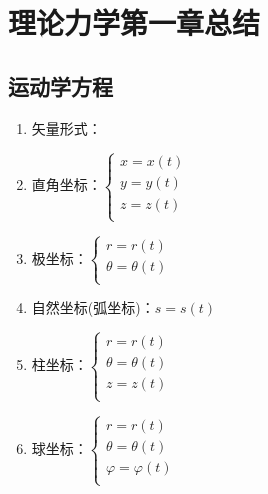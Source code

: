 \documentclass[UTF-8]{ctexart}
\begin{document}
\section{理论力学第一章总结}
\subsection{运动学方程}
\begin{enumerate}
    \item 矢量形式：
    \item 直角坐标：$
              \left \{ \begin{array}{l}
                  x=x(t) \\
                  y=y(t) \\
                  z=z(t) \\
              \end{array} \right.
          $
    \item 极坐标：$
              \left \{ \begin{array}{l}
                  r=r(t)              \\
                  \theta = \theta (t) \\
              \end{array} \right.
          $
    \item 自然坐标(弧坐标)：$
              s = s(t)
          $
    \item 柱坐标：$
              \left \{ \begin{array}{l}
                  r=r(t)              \\
                  \theta = \theta (t) \\
                  z=z(t)              \\
              \end{array} \right.
          $
    \item 球坐标：$
              \left \{ \begin{array}{l}
                  r=r(t)                \\
                  \theta = \theta (t)   \\
                  \varphi = \varphi (t) \\
              \end{array} \right.
          $
\end{enumerate}
\end{document}
